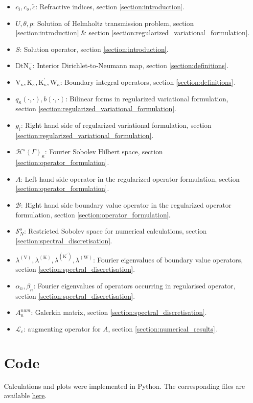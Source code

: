 \documentclass[12pt,journal,compsoc, onecolumn]{IEEEtran}
\begin{document}
\begin{itemize}
    \item $c_i, c_o, \tilde c$: Refractive indices, section \ref{section:introduction}.
    \item $U, \theta, p$: Solution of Helmholtz transmission problem, section \ref{section:introduction} \& section \ref{section:regularized_variational_formulation}.
    \item $S$: Solution operator, section \ref{section:introduction}.
    \item $\mathrm{DtN}^-_\kappa$: Interior Dirichlet-to-Neumann map, section \ref{section:definitions}.
    \item $\mathrm{V}_\kappa, \mathrm{K}_\kappa, \mathrm{K}^\prime_\kappa, \mathrm{W}_\kappa$: Boundary integral operators, section \ref{section:definitions}.
    \item $q_\kappa(\cdot, \cdot), b(\cdot, \cdot)$: Bilinear forms in regularized variational formulation, section \ref{section:regularized_variational_formulation}.
    \item $g_i$: Right hand side of regularized variational formulation, section \ref{section:regularized_variational_formulation}.
    \item \(\mathcal{H}^{s}(\Gamma)_{\tilde \kappa}\): Fourier Sobolev Hilbert space, section \ref{section:operator_formulation}.
    \item $A$: Left hand side operator in the regularized operator formulation, section \ref{section:operator_formulation}.
    \item $\mathcal{B}$: Right hand side boundary value operator in the regularized operator formulation, section \ref{section:operator_formulation}.
    \item $\mathcal{S}^s_N$: Restricted Sobolev space for numerical calculations, section \ref{section:spectral_discretisation}.
    \item $\lambda^{(\mathrm{V})}, \lambda^{(\mathrm{K})}, \lambda^{(\mathrm{K}^\prime)}, \lambda^{(\mathrm{W})}$: Fourier eigenvalues of boundary value operators, section \ref{section:spectral_discretisation}.
    \item $\alpha_n, \beta_n$: Fourier eigenvalues of operators occurring in regularised operator, section \ref{section:spectral_discretisation}.
    \item $A^{num}_n$: Galerkin matrix, section \ref{section:spectral_discretisation}.
    \item \(\mathcal{L}_\varepsilon\): augmenting operator  for  $A$, section \ref{section:numerical_results}.
\end{itemize}
    
    

\section*{Code}
Calculations and plots were implemented in Python. The corresponding files are available \href{https://github.com/FredericJorgensen/spurious-quasi-resonances-coupled-variational-formulation}{here}.



\end{document}
